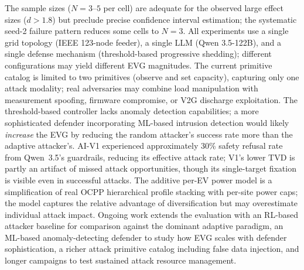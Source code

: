 The sample sizes ($N = 3$--$5$ per cell) are adequate for the observed large effect sizes ($d > 1.8$) but preclude precise confidence interval estimation; the systematic seed-2 failure pattern reduces some cells to $N = 3$.
%
All experiments use a single grid topology (IEEE 123-node feeder), a single LLM (Qwen 3.5-122B), and a single defense mechanism (threshold-based progressive shedding); different configurations may yield different EVG magnitudes.
%
The current primitive catalog is limited to two primitives (observe and set capacity), capturing only one attack modality; real adversaries may combine load manipulation with measurement spoofing, firmware compromise, or V2G discharge exploitation.
%
The threshold-based controller lacks anomaly detection capabilities; a more sophisticated defender incorporating ML-based intrusion detection would likely \emph{increase} the EVG by reducing the random attacker's success rate more than the adaptive attacker's.
%
AI-V1 experienced approximately 30\% safety refusal rate from Qwen~3.5's guardrails, reducing its effective attack rate; V1's lower TVD is partly an artifact of missed attack opportunities, though its single-target fixation is visible even in successful attacks.
%
The additive per-EV power model is a simplification of real OCPP hierarchical profile stacking with per-site power caps; the model captures the relative advantage of diversification but may overestimate individual attack impact.
%
Ongoing work extends the evaluation with an RL-based attacker baseline for comparison against the dominant adaptive paradigm, an ML-based anomaly-detecting defender to study how EVG scales with defender sophistication, a richer attack primitive catalog including false data injection, and longer campaigns to test sustained attack resource management.
